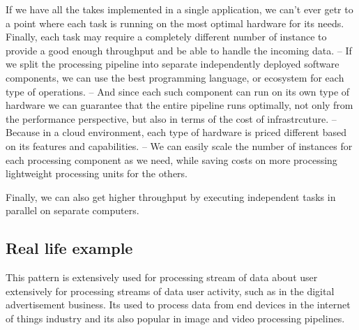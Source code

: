 If we have all the takes implemented in a single application, we can't ever getr to a point where each task is running on the most optimal hardware for its needs.
Finally, each task may require a completely different number of instance to provide a good enough throughput and be able to handle the incoming data.
-- If we split the processing pipeline into separate independently deployed software components, we can use the best programming language, or ecosystem for each type of operations.
-- And since each such component can run on its own type of hardware we can guarantee that the entire pipeline runs optimally, not only from the performance perspective, but also in terms of the cost of infrastrcuture.
-- Because in a cloud environment, each type of hardware is priced different based on its features and capabilities.
-- We can easily scale the number of instances for each processing component as we need, while saving costs on more processing lightweight processing units for the others.

Finally, we can also get higher throughput by executing independent tasks in parallel on separate computers.

\subsection{Real life example}
This pattern is extensively used for processing stream of data about user extensively for processing streams of data user activity, such as in the digital advertisement business.
Its used to process data from end devices in the internet of things industry and its also popular in image and video processing pipelines.

